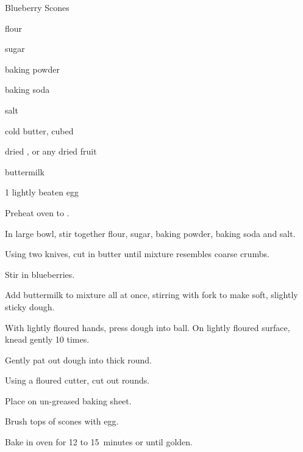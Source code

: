 \begin{recipe}{Blueberry Scones}{}{}

\begin{ingredients}
\item \C{2\quarter} flour
\item {} sugar
\item \tp{2\half} baking powder
\item \tp{\half} baking soda
\item \tp{\half} salt
\item \C{\half} cold butter, cubed
\item \C{\half} dried ,  or any dried fruit
\item {} buttermilk
\item 1 lightly beaten egg
\end{ingredients}

\begin{directions}
\item Preheat oven to .
\item In large bowl, stir together flour, sugar, baking powder, baking soda and salt.
\item Using two knives, cut in butter until mixture resembles coarse crumbs.
\item Stir in blueberries.
\item Add buttermilk to mixture all at once, stirring with fork to make soft, slightly sticky dough.
\item With lightly floured hands, press dough into ball. On lightly floured surface, knead gently 10 times.
\item Gently pat out dough into  thick round.
\item Using a  floured cutter, cut out rounds.
\item Place on un-greased baking sheet.
\item Brush tops of scones with egg.
\item Bake in oven for 12 to 15~minutes or until golden.
\end{directions}

\end{recipe}
